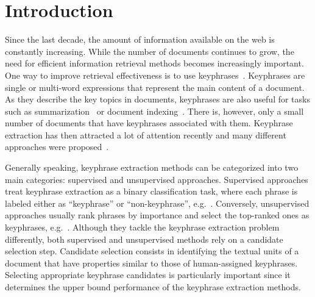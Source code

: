 \section{Introduction}
\label{sec:section}

  Since the last decade, the amount of information available on the web is constantly increasing.
  While the number of documents continues to grow, the need for efficient information retrieval methods becomes increasingly important.
  One way to improve retrieval effectiveness is to use keyphrases~\cite{jones1999phrasier}.
  Keyphrases are single or multi-word expressions that represent the main content of a document.
  As they describe the key topics in documents, keyphrases are also useful for tasks such as summarization~\cite{avanzo2005keyphrase} or document indexing~\cite{medelyan2008smalltrainingset}.
  There is, however, only a small number of documents that have keyphrases associated with them.
  Keyphrase extraction has then attracted a lot of attention recently and many different approaches were proposed~\cite{kim2010semeval}.


  Generally speaking, keyphrase extraction methods can be categorized into two main categories: supervised and unsupervised approaches.
  Supervised approaches treat keyphrase extraction as a binary classification task, where each phrase is labeled either as ``keyphrase'' or ``non-keyphrase'', e.g.~\cite{witten1999kea}.
  Conversely, unsupervised approaches usually rank phrases by importance and select the top-ranked ones as keyphrases, e.g.~\cite{mihalcea2004textrank}.
  Although they tackle the keyphrase extraction problem differently, both supervised and unsupervised methods rely on a candidate selection step.
  Candidate selection consists in identifying the textual units of a document that have properties similar to those of human-assigned keyphrases.
  Selecting appropriate keyphrase candidates is particularly important since it determines the upper bound performance of the keyphrase extraction methods.

